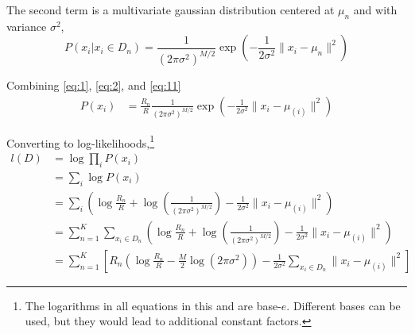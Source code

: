 \documentclass[letterpaper]{article}
\begin{document}




The second term is a multivariate gaussian distribution centered at
$\mu_n$ and with variance $\sigma^2$,
%
\begin{equation}
  \label{eq:11}
  P(x_i|x_i \in D_n) = \frac{1}{(2 \pi \sigma^2)^{M/2}} \exp\left( -\frac{1}{2 \sigma^2} \| x_i - \mu_n \|^2\right)
\end{equation}

Combining \eqref{eq:1}, \eqref{eq:2}, and \eqref{eq:11}
%
\begin{align}
  \label{eq:12}
  P(x_i) & = \frac{R_n}{R} \frac{1}{(2 \pi \sigma^2)^{M/2}} \exp\left( -\frac{1}{2 \sigma^2} \| x_i - \mu_{(i)} \|^2\right) 
\end{align}

Converting to log-likelihoods,\footnote{The logarithms in all equations in this and \cite{Pelleg2000} are base-$e$.  Different bases can be used, but they
would lead to additional constant factors.}
%
\begin{align}
  l(D) & = \log \prod_i P(x_i) \nonumber \\
  & = \sum_i \log P(x_i) \nonumber \\
  \label{eq:13}
  & = \sum_i \left( \log \frac{R_n}{R}
                        + \log \left( \frac{1}{(2 \pi \sigma^2)^{M/2}} \right)
                        - \frac{1}{2\sigma^2} \|x_i - \mu_{(i)}\|^2 \right) \\
  & = \sum_{n=1}^K \sum_{x_i \in D_n} \left( \log \frac{R_n}{R}
                        + \log \left( \frac{1}{(2 \pi \sigma^2)^{M/2}} \right)
                        - \frac{1}{2\sigma^2} \|x_i - \mu_{(i)}\|^2 \right) \\
  & = \sum_{n=1}^K \left[ R_n \left( \log \frac{R_n}{R}
                                     - \frac{M}{2} \log \left(2 \pi \sigma^2 \right) \right)
                          - \frac{1}{2\sigma^2} \sum_{x_i \in D_n} \|x_i - \mu_{(i)}\|^2 \right]
\end{align}
\end{document}
